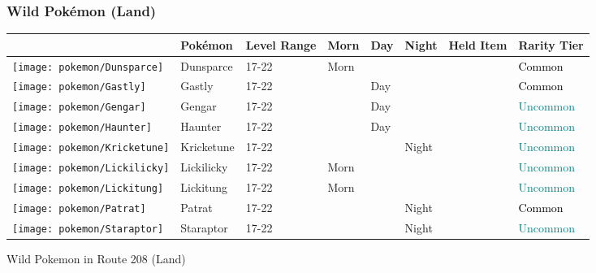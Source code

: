 \subsubsection{Wild Pokémon (Land)}%
\label{ssubsec:WildPokmon(Land)}%
\begin{longtable}{||l l l l l l l l||}%
\hline%
&Pokémon&Level Range&Morn&Day&Night&Held Item&Rarity Tier\\%
\hline%
\endhead%
\hline%
\texttt{[image: pokemon/Dunsparce]}&Dunsparce&17{-}22&Morn&&&&\textcolor{black}{%
Common%
}\\%
\hline%
\texttt{[image: pokemon/Gastly]}&Gastly&17{-}22&&Day&&&\textcolor{black}{%
Common%
}\\%
\hline%
\texttt{[image: pokemon/Gengar]}&Gengar&17{-}22&&Day&&&\textcolor{teal}{%
Uncommon%
}\\%
\hline%
\texttt{[image: pokemon/Haunter]}&Haunter&17{-}22&&Day&&&\textcolor{teal}{%
Uncommon%
}\\%
\hline%
\texttt{[image: pokemon/Kricketune]}&Kricketune&17{-}22&&&Night&&\textcolor{teal}{%
Uncommon%
}\\%
\hline%
\texttt{[image: pokemon/Lickilicky]}&Lickilicky&17{-}22&Morn&&&&\textcolor{teal}{%
Uncommon%
}\\%
\hline%
\texttt{[image: pokemon/Lickitung]}&Lickitung&17{-}22&Morn&&&&\textcolor{teal}{%
Uncommon%
}\\%
\hline%
\texttt{[image: pokemon/Patrat]}&Patrat&17{-}22&&&Night&&\textcolor{black}{%
Common%
}\\%
\hline%
\texttt{[image: pokemon/Staraptor]}&Staraptor&17{-}22&&&Night&&\textcolor{teal}{%
Uncommon%
}\\%
\hline%
\end{longtable}%
\caption{Wild Pokemon in Route 208 (Land)}